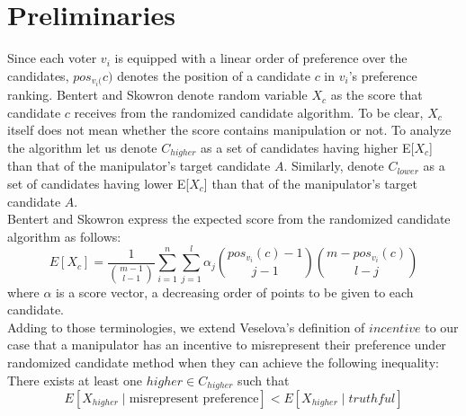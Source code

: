 \documentclass[letterpaper]{article} %
\begin{document}
\section{Preliminaries}
Since each voter $v_i$ is equipped with a linear order of preference over the candidates, $pos_{v_i(}c)$ denotes the position of a candidate $c$ in $v_i$’s preference ranking. Bentert and Skowron denote random variable $X_c$ as the score that candidate $c$ receives from the randomized candidate algorithm. To be clear, $X_c$ itself does not mean whether the score contains manipulation or not. To analyze the algorithm let us denote $C_{higher}$ as a set of candidates having higher E[$X_c$] than that of the manipulator’s target candidate $A$. Similarly, denote $C_{lower}$  as a set of candidates having lower E[$X_c$] than that of the manipulator’s target candidate $A$.%
\\Bentert and Skowron express the expected score from the randomized candidate algorithm as follows: \\ 
\begin{equation} 
E[X_c] = \frac{1}{\binom{m-1}{l-1}}\sum_{i=1}^n \sum_{j=1}^l \alpha_j \binom{pos_{v_i}(c)-1}{j-1}\binom{m-pos_{v_i}(c)}{l-j} 
\end{equation}
where $\alpha$ is a score vector, a decreasing order of points to be given to each candidate. %
\\Adding to those terminologies, we extend Veselova's definition of $incentive$ to our case that a manipulator has an incentive to misrepresent their preference under randomized candidate method when they can achieve the following inequality: \\
There exists at least one $higher \in C_{higher}$ such that
\begin{equation}
E[X_{higher} \mid \text{misrepresent preference}] < E[X_{higher} \mid truthful]\nonumber 
\end{equation}
\end{document}
